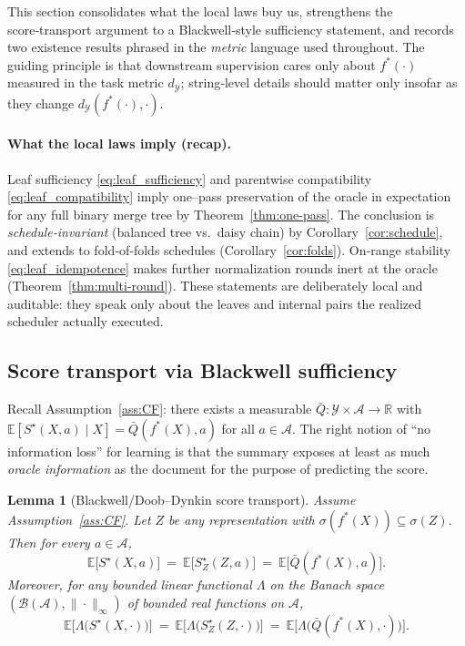 \documentclass[11pt]{article}
\newtheorem{lemma}{Lemma}
\newcommand{\Y}{\mathcal{Y}}               %
\newcommand{\A}{\mathcal{A}}               %
\newcommand{\fstar}{f^*}               %
\newcommand{\sstar}{S^\star}               %
\newcommand{\E}{\mathbb{E}}
\newcommand{\metric}{d_{\Y}}
\begin{document}
This section consolidates what the local laws buy us, strengthens the score‑transport argument to a Blackwell‑style sufficiency statement, and records two existence results phrased in the \emph{metric} language used throughout. The guiding principle is that downstream supervision cares only about $\fstar(\cdot)$ measured in the task metric $\metric$; string‑level details should matter only insofar as they change $\metric(\fstar(\cdot),\cdot)$.

\paragraph{What the local laws imply (recap).}
Leaf sufficiency \eqref{eq:leaf_sufficiency} and parentwise compatibility \eqref{eq:leaf_compatibility} imply one–pass preservation of the oracle in expectation for any full binary merge tree by Theorem~\ref{thm:one-pass}. The conclusion is \emph{schedule‑invariant} (balanced tree vs.\ daisy chain) by Corollary~\ref{cor:schedule}, and extends to fold‑of‑folds schedules (Corollary~\ref{cor:folds}). On‑range stability \eqref{eq:leaf_idempotence} makes further normalization rounds inert at the oracle (Theorem~\ref{thm:multi-round}). These statements are deliberately local and auditable: they speak only about the leaves and internal pairs the realized scheduler actually executed.


\subsection{Score transport via Blackwell sufficiency}
\label{sec:transport}

Recall Assumption~\ref{ass:CF}: there exists a measurable $\bar Q:\Y\times\A\to\mathbb{R}$ with
$\E[\sstar(X,a)\mid X]=\bar Q(\fstar(X),a)$ for all $a\in\A$.
The right notion of ``no information loss'' for learning is that the summary exposes at least as much \emph{oracle information} as the document for the purpose of predicting the score.



\begin{lemma}[Blackwell/Doob–Dynkin score transport]
\label{lem:blackwell-transport}
Assume Assumption~\ref{ass:CF}. Let $Z$ be any representation with $\sigma(\fstar(X))\subseteq\sigma(Z)$.
Then for every $a\in\A$,
\[
\E\!\big[\sstar(X,a)\big]\ =\ \E\!\big[\sstar_Z(Z,a)\big]\ =\ \E\!\big[\bar Q(\fstar(X),a)\big].
\]
Moreover, for any bounded linear functional $\Lambda$ on the Banach space $(\mathcal{B}(\A),\|\cdot\|_\infty)$ of bounded real functions on $\A$,
\[
\E\!\big[\Lambda\big(\sstar(X,\cdot)\big)\big]
\ =\
\E\!\big[\Lambda\big(\sstar_Z(Z,\cdot)\big)\big]
\ =\
\E\!\big[\Lambda\big(\bar Q(\fstar(X),\cdot)\big)\big].
\]
\end{lemma}
\end{document}
